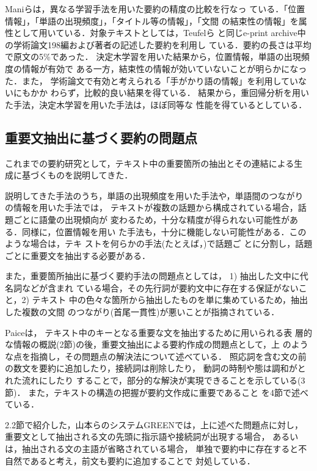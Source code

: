 Maniら\cite{mani:98:b}は，異なる学習手法を用いた要約の精度の比較を行なっ
ている．「位置情報」，「単語の出現頻度」，「タイトル等の情報」，「文間
の結束性の情報」を属性として用いている．対象テキストとしては，Teufelら
と同じe-print archive中の学術論文198編および著者の記述した要約を利用し
ている．要約の長さは平均で原文の5\%であった．
決定木学習を用いた結果から，位置情報，単語の出現頻度の情報が有効で
ある一方，結束性の情報が効いていないことが明らかになった．また，
学術論文で有効と考えられる「手がかり語の情報」を利用していないにもかか
わらず，比較的良い結果を得ている．
結果から，重回帰分析を用いた手法，決定木学習を用いた手法は，ほぼ同等な
性能を得ているとしている．

\subsection{重要文抽出に基づく要約の問題点}

これまでの要約研究として，テキスト中の重要箇所の抽出とその連結による生
成に基づくものを説明してきた．

説明してきた手法のうち，単語の出現頻度を用いた手法や，単語間のつながり
の情報を用いた手法では，
テキストが複数の話題から構成されている場合，話題ごとに語彙の出現傾向が
変わるため，十分な精度が得られない可能性がある．同様に，位置情報を用い
た手法も，十分に機能しない可能性がある．このような場合は，テキ
ストを何らかの手法(たとえば，\cite{hearst:94:b,mochizuki:99:a})で話題ご
とに分割し，話題ごとに重要文を抽出する必要がある\cite{nakao:98:a}．

また，重要箇所抽出に基づく要約手法の問題点としては，
1) 抽出した文中に代名詞などが含まれ
ている場合，その先行詞が要約文中に存在する保証がないこと，2) テキスト
中の色々な箇所から抽出したものを単に集めているため，抽出した複数の文間
のつながり(首尾一貫性)が悪いことが指摘されている．

Paice\cite{paice:90:a}は，
テキスト中のキーとなる重要な文を抽出するために用いられる表
層的な情報の概説(2節)の後，重要文抽出による要約作成の問題点として，上
のような点を指摘し，その問題点の解決法について述べている．
照応詞を含む文の前の数文を要約に追加したり，接続詞は削除したり，
動詞の時制や態は調和がとれた流れにしたり
することで，部分的な解決が実現できることを示している(3節)．
また，テキストの構造の把握が要約文作成に重要であること
を4節で述べている．

2.2節で紹介した，山本らのシステムGREENでは，上に述べた問題点に対し，
重要文として抽出される文の先頭に指示語や接続詞が出現する場合，
あるいは，抽出される文の主語が省略されている場合，
単独で要約中に存在すると不自然であると考え，前文も要約に追加することで
対処している．

